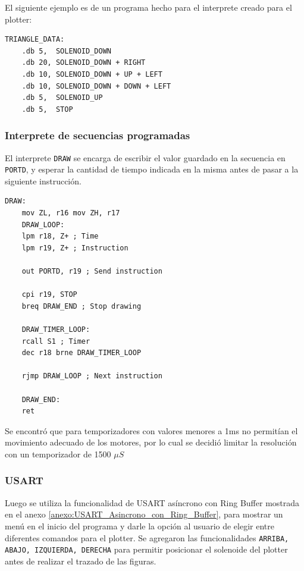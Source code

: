 El siguiente ejemplo es de un programa hecho para el interprete creado para el plotter:
\begin{verbatim}
TRIANGLE_DATA:
    .db 5,  SOLENOID_DOWN	
    .db 20, SOLENOID_DOWN + RIGHT			
    .db 10, SOLENOID_DOWN + UP + LEFT		
    .db 10, SOLENOID_DOWN + DOWN + LEFT
    .db 5,  SOLENOID_UP		
    .db 5,  STOP
\end{verbatim}

\subsubsection{Interprete de secuencias programadas}

El interprete \texttt{DRAW} se encarga de escribir el valor guardado en la secuencia en \texttt{PORTD}, y esperar la cantidad de tiempo indicada en la misma antes de pasar a la siguiente instrucción.

\begin{verbatim}
DRAW:
    mov ZL, r16 mov ZH, r17
    DRAW_LOOP:
    lpm r18, Z+ ; Time
    lpm r19, Z+ ; Instruction

    out PORTD, r19 ; Send instruction

    cpi r19, STOP
    breq DRAW_END ; Stop drawing

    DRAW_TIMER_LOOP: 
    rcall S1 ; Timer
    dec r18 brne DRAW_TIMER_LOOP 

    rjmp DRAW_LOOP ; Next instruction

    DRAW_END:
    ret
\end{verbatim}
Se encontró que para temporizadores con valores menores a 1ms no permitían el movimiento adecuado de los motores, por lo cual se decidió limitar la resolución con un temporizador de 1500 $\mu S$

\subsubsection{USART}
Luego se utiliza la funcionalidad de USART asíncrono con Ring Buffer mostrada en el anexo \ref{anexo:USART_Asincrono_con_Ring_Buffer}, para mostrar un menú en el inicio del programa y darle la opción al usuario de elegir entre diferentes comandos para el plotter. Se agregaron las funcionalidades \texttt{ARRIBA, ABAJO, IZQUIERDA, DERECHA} para permitir posicionar el solenoide del plotter antes de realizar el trazado de las figuras.

